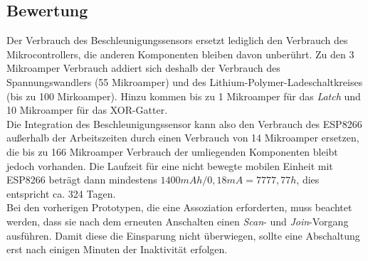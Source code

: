 \subsection{Bewertung}
Der Verbrauch des Beschleunigungssensors ersetzt lediglich den Verbrauch des Mikrocontrollers, die anderen Komponenten bleiben davon unberührt.
Zu den 3 Mikroamper Verbrauch addiert sich deshalb der Verbrauch des Spannungswandlers (55 Mikroamper) und des Lithium-Polymer-Ladeschaltkreises (bis zu 100 Mirkoamper).
Hinzu kommen bis zu 1 Mikroamper für das \emph{Latch} und 10 Mikroamper für das XOR-Gatter.\\
Die Integration des Beschleunigungssensor kann also den Verbrauch des ESP8266 außerhalb der Arbeitszeiten durch einen Verbrauch von 14 Mikroamper ersetzen, die bis zu 166 Mikroamper Verbrauch der umliegenden Komponenten bleibt jedoch vorhanden.
Die Laufzeit für eine nicht bewegte mobilen Einheit mit ESP8266 beträgt dann mindestens $1400mAh / 0,18mA = 7777,77h$, dies entspricht ca. 324 Tagen.\\
Bei den vorherigen Prototypen, die eine Assoziation erforderten, muss beachtet werden, dass sie nach dem erneuten Anschalten einen \emph{Scan}- und \emph{Join}-Vorgang ausführen.
Damit diese die Einsparung nicht überwiegen, sollte eine Abschaltung erst nach einigen Minuten der Inaktivität erfolgen.


